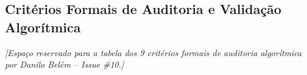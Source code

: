 \subsection{Critérios Formais de Auditoria e Validação Algorítmica}
\label{sec:criterios_auditoria}

\noindent\textit{[Espaço reservado para a tabela dos 9 critérios formais de auditoria algorítmica por Danilo Belém -- Issue \#10.]}
